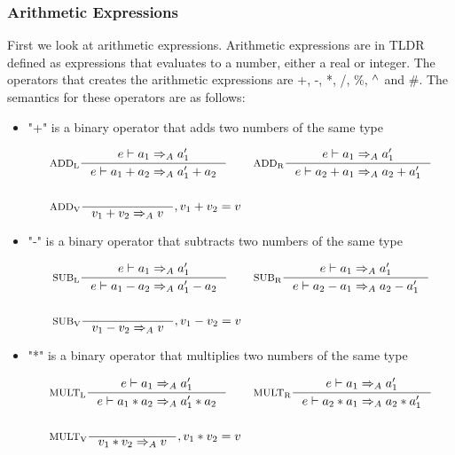 \subsubsection{Arithmetic Expressions}

First we look at arithmetic expressions. Arithmetic expressions are in TLDR defined as expressions that evaluates to a number, either a real or integer. The operators that creates the arithmetic expressions are +, -, *, /, \%, $^\wedge{}$ and \#. The semantics for these operators are as follows:

\begin{itemize}
\item "+" is a binary operator that adds two numbers of the same type

\begin{align*}
&\inference[$\text{ADD}_\text{L}$]{e \vdash a_1 \Rightarrow_A a_1'}
                    {e \vdash  a_1 + a_2 \Rightarrow_A a_1' + a_2}
&
&\inference[$\text{ADD}_\text{R}$]{e \vdash a_1 \Rightarrow_A a_1'}
                    {e \vdash a_2 + a_1 \Rightarrow_A a_2 + a_1'}
\\\\
&\inference[$\text{ADD}_\text{V}$]{}
                    {v_1 + v_2 \Rightarrow_A v}
                    {, v_1 + v_2 = v}
\end{align*}

\item "-" is a binary operator that subtracts two numbers of the same type

\begin{align*}
&\inference[$\text{SUB}_\text{L}$]{e \vdash a_1 \Rightarrow_A a_1'}
                    {e \vdash a_1 - a_2 \Rightarrow_A a_1' - a_2}
&
&\inference[$\text{SUB}_\text{R}$]{e \vdash a_1 \Rightarrow_A a_1'}
                    {e \vdash a_2 - a_1 \Rightarrow_A a_2 - a_1'}
\\\\
&\inference[$\text{SUB}_\text{V}$]{}
                    {v_1 - v_2 \Rightarrow_A v}
                    {, v_1 - v_2 = v}
\end{align*}

\item "*" is a binary operator that multiplies two numbers of the same type

\begin{align*}
&\inference[$\text{MULT}_\text{L}$]{e \vdash a_1 \Rightarrow_A a_1'}
                     {e \vdash a_1 * a_2 \Rightarrow_A a_1' * a_2}
&
&\inference[$\text{MULT}_\text{R}$]{e \vdash a_1 \Rightarrow_A a_1'}
                     {e \vdash a_2 * a_1 \Rightarrow_A a_2 * a_1'}
\\\\
&\inference[$\text{MULT}_\text{V}$]{}
                     {v_1 * v_2 \Rightarrow_A v}
                     {, v_1 * v_2 = v}
\end{align*}


\end{itemize}
